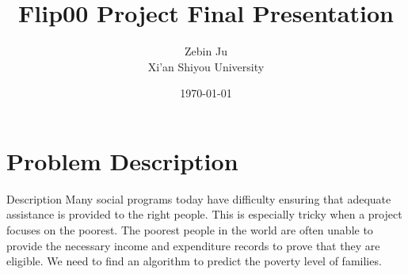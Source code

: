 \documentclass[
 size=12pt,
 paper=smartboard, %
 mode=present, %
 display=slides, %
style=tuliplab,
pauseslide,
fleqn,leqno]{powerdot}
\title{Flip00 Project Final Presentation}
\author{
Zebin Ju
\\
Xi'an Shiyou University 
}
\date{\today}
\begin{document}
\maketitle 
  \section{Problem Description}
    
  \begin{slide}{Description}
     \setlength{\parindent}{1.5em}
     Many social programs today have difficulty ensuring that adequate assistance is provided to the right people. This is especially tricky when a project focuses on the poorest. The poorest people in the world are often unable to provide the necessary income and expenditure records to prove that they are eligible. We need to find an algorithm to predict the poverty level of families.
  \end{slide}

    \tableofcontents[content=sections]%
\end{document}
